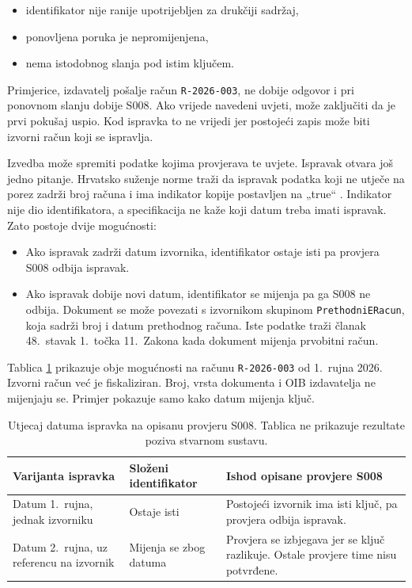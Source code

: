 \begin{itemize}[nosep, leftmargin=1.4cm]
  \item identifikator nije ranije upotrijebljen za drukčiji sadržaj,
  \item ponovljena poruka je nepromijenjena,
  \item nema istodobnog slanja pod istim ključem.
\end{itemize}

Primjerice, izdavatelj pošalje račun \texttt{R-2026-003}, ne dobije odgovor
i pri ponovnom slanju dobije S008. Ako vrijede navedeni uvjeti, može
zaključiti da je prvi pokušaj uspio. Kod ispravka to ne vrijedi jer
postojeći zapis može biti izvorni račun koji se ispravlja.

Izvedba može spremiti podatke kojima provjerava te uvjete. Ispravak otvara
još jedno pitanje. Hrvatsko suženje norme traži da ispravak podatka koji ne
utječe na porez zadrži broj računa i ima indikator kopije postavljen na
„true“ \cite{pu2026hrcius}. Indikator nije dio identifikatora, a
specifikacija ne kaže koji datum treba imati ispravak. Zato postoje dvije
mogućnosti:

\begin{itemize}[nosep, leftmargin=1.4cm]
  \item Ako ispravak zadrži datum izvornika, identifikator ostaje isti pa
    provjera S008 odbija ispravak.
  \item Ako ispravak dobije novi datum, identifikator se mijenja pa ga S008
    ne odbija. Dokument se može povezati s izvornikom skupinom
    \texttt{PrethodniERacun}, koja sadrži broj i datum prethodnog računa.
    Iste podatke traži članak 48.\ stavak 1.\ točka 11.\ Zakona kada
    dokument mijenja prvobitni račun.
\end{itemize}

Tablica \ref{tab:b2-datum} prikazuje obje mogućnosti na računu
\texttt{R-2026-003} od 1.~rujna 2026. Izvorni račun već je fiskaliziran.
Broj, vrsta dokumenta i OIB izdavatelja ne mijenjaju se. Primjer pokazuje
samo kako datum mijenja ključ.

\begin{table}[htbp]
\centering
\caption[Datum ispravka i provjera S008]{Utjecaj datuma ispravka na opisanu
provjeru S008. Tablica ne prikazuje rezultate poziva stvarnom sustavu.}
\label{tab:b2-datum}
\small
\begin{tabular}{@{}>{\raggedright\arraybackslash}p{}>{\raggedright\arraybackslash}p{}>{\raggedright\arraybackslash}p{}@{}}
\toprule
Varijanta ispravka & Složeni identifikator & Ishod opisane provjere S008 \\
\midrule
Datum 1.~rujna, jednak izvorniku & Ostaje isti & Postojeći izvornik ima
isti ključ, pa provjera odbija ispravak. \\
\addlinespace
Datum 2.~rujna, uz referencu na izvornik & Mijenja se zbog datuma &
Provjera se izbjegava jer se ključ razlikuje. Ostale provjere time nisu
potvrđene. \\
\bottomrule
\end{tabular}
\end{table}

